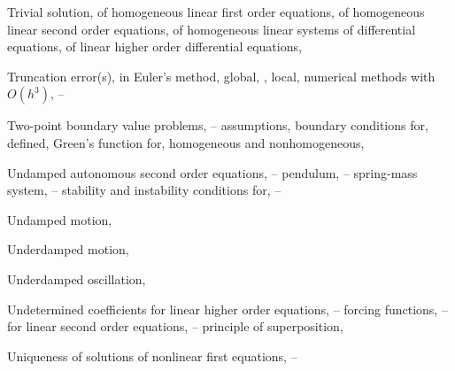 \begin{theindex}
  \item Trivial solution,
    \subitem of homogeneous linear first order equations, \pageref{example:2.1.1}
    \subitem of homogeneous linear second order equations, \pageref{thmtype:5.1.1}
    \subitem of homogeneous linear systems of differential equations, \pageref{eq:10.3.1}
    \subitem of linear higher order differential equations, \pageref{thmtype:9.1.1}

  \item Truncation error(s), \pageref{eq:3.1.2}
    \subitem in Euler's method, \pageref{eq:3.1.9}
    \subitem global, \pageref{eq:3.1.18}, \pageref{eq:3.2.1}
    \subitem local, \pageref{eq:3.1.8}
      \subsubitem numerical methods with $O(h^{3})$, \pageref{eq:3.2.7}--\pageref{exer:3.2.1}

  \item Two-point boundary value problems, \pageref{eq:13.1.1}--\pageref{exer:13.1.32}
    \subitem assumptions, \pageref{eq:13.1.5}
    \subitem boundary conditions for, \pageref{eq:13.1.5}
    \subitem defined, \pageref{eq:13.1.5}
    \subitem Green's function for, \pageref{eq:13.1.19}
    \subitem homogeneous and nonhomogeneous, \pageref{example:13.1.1} 

  \item Undamped autonomous second order equations, \pageref{eq:4.4.7}--\pageref{eq:4.4.23}
    \subitem pendulum, \pageref{eq:4.4.26}--\pageref{eq:4.4.17}
    \subitem spring-mass system, \pageref{eq:4.4.8}--\pageref{eq:4.4.12}
    \subitem stability and instability conditions for, \pageref{eq:4.4.18}--\pageref{eq:4.4.23}

  \item Undamped motion, \pageref{eq:6.1.1}

  \item Underdamped motion, \pageref{eq:6.2.2}

  \item Underdamped oscillation, \pageref{eq:6.3.9}

  \item Undetermined coefficients
    \subitem for linear higher order equations, \pageref{eq:9.3.1}--\pageref{exer:9.3.75}
      \subsubitem forcing functions, \pageref{example:9.3.1}--\pageref{exer:9.3.1}
    \subitem for linear second order equations, \pageref{eq:5.4.1}--\pageref{exer:5.5.40}
    \subitem principle of superposition, \pageref{example:5.4.7}

  \item Uniqueness of solutions of nonlinear first equations, \pageref{thmtype:2.3.1}--\pageref{exer:2.3.21}


\end{theindex}
